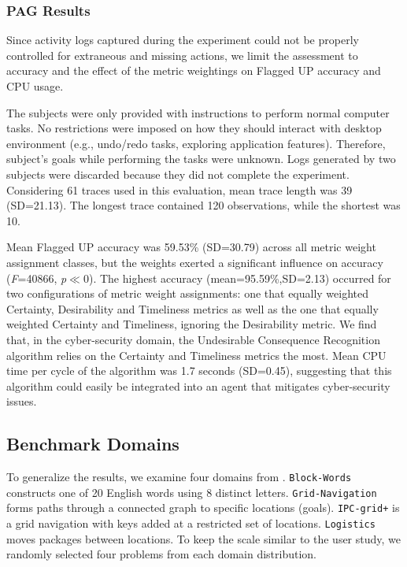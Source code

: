 \subsubsection{PAG Results}
Since activity logs captured during the experiment could not be properly controlled for extraneous and missing actions, we limit the assessment to accuracy and the effect of the metric weightings on Flagged UP accuracy and CPU usage.

The subjects were only provided with instructions to perform normal computer tasks. No restrictions were imposed on how they should interact with desktop environment (e.g., undo/redo tasks, exploring application features). Therefore, subject's goals while performing the tasks were unknown. Logs generated by two subjects were discarded because they did not complete the experiment. Considering 61 traces used in this evaluation, mean trace length was 39 (SD=21.13). The longest trace contained 120 observations, while the shortest was 10. 


Mean Flagged UP accuracy was 59.53\% (SD=30.79) across all metric weight assignment classes, but the weights exerted a significant influence on accuracy (\textit{F}=40866, \textit{p}$\ll$0). 
The highest accuracy (mean=95.59\%,SD=2.13) occurred for two configurations of metric weight assignments: one that equally weighted Certainty, Desirability and Timeliness metrics as well as the one that equally weighted Certainty and Timeliness, ignoring the Desirability metric. 
We find that, in the cyber-security domain, the Undesirable Consequence Recognition algorithm relies on the Certainty and Timeliness metrics the most.
Mean CPU time per cycle of the algorithm was 1.7 seconds (SD=0.45), suggesting that this algorithm could easily be integrated into an agent that mitigates cyber-security issues.


\subsection{Benchmark Domains}
To generalize the results, we examine four domains from \cite{ramirez2009plan}. 
\sloppy
{\tt Block-Words} constructs one of 20 English words using 8 distinct letters. {\tt Grid-Navigation} forms paths through a connected graph to specific locations (goals). {\tt IPC-grid+} is a grid navigation with keys added at a restricted set of locations. {\tt Logistics} moves packages between locations. To keep the scale similar to the user study, we randomly selected four problems from each domain distribution.

